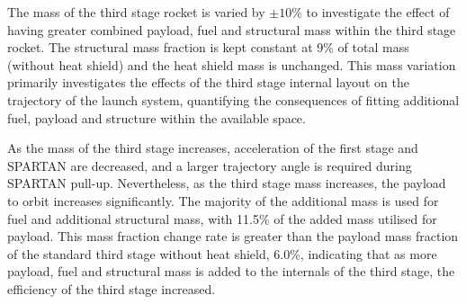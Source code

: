 The mass of the third stage rocket is varied by $\pm10\%$ to investigate the effect of having greater combined  payload, fuel and structural mass within the third stage rocket. The structural mass fraction is kept constant at 9\% of total mass (without heat shield) and the heat shield mass is unchanged. This mass variation primarily investigates the effects of the third stage internal layout on the trajectory of the launch system, quantifying the consequences of fitting additional fuel, payload and structure within the available space.
  
 As the mass of the third stage increases, acceleration of the first stage and SPARTAN are decreased, and a larger trajectory angle is required during SPARTAN pull-up. Nevertheless, as the third stage mass increases, the payload to orbit increases significantly.
The majority of the additional mass is used for fuel and additional structural mass, with 11.5\% of the added mass utilised for payload. This mass fraction change rate is greater than the payload mass fraction of the standard third stage without heat shield, 6.0\%, indicating that as more payload, fuel and structural mass is added to the internals of the third stage, the efficiency of the third stage increased.


